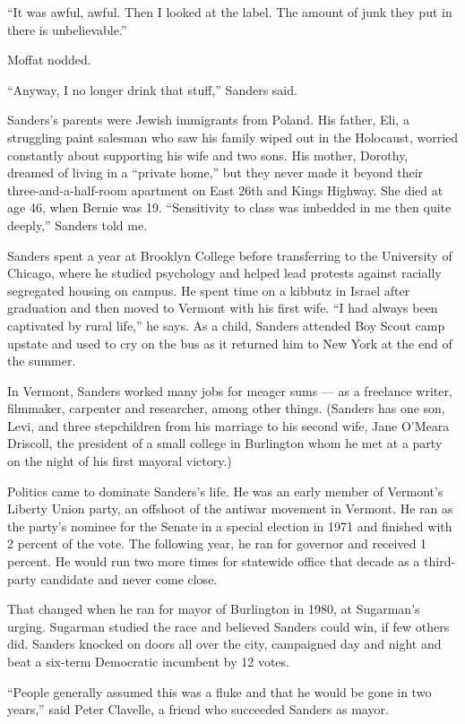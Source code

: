 ``It was awful, awful. Then I looked at the label. The amount of junk
they put in there is unbelievable.''

Moffat nodded.

``Anyway, I no longer drink that stuff,'' Sanders said.

Sanders's parents were Jewish immigrants from Poland. His father, Eli, a
struggling paint salesman who saw his family wiped out in the Holocaust,
worried constantly about supporting his wife and two sons. His mother,
Dorothy, dreamed of living in a ``private home,'' but they never made it
beyond their three-and-a-half-room apartment on East 26th and Kings
Highway. She died at age 46, when Bernie was 19. ``Sensitivity to class
was imbedded in me then quite deeply,'' Sanders told me.

Sanders spent a year at Brooklyn College before transferring to the
University of Chicago, where he studied psychology and helped lead
protests against racially segregated housing on campus. He spent time on
a kibbutz in Israel after graduation and then moved to Vermont with his
first wife. ``I had always been captivated by rural life,'' he says. As
a child, Sanders attended Boy Scout camp upstate and used to cry on the
bus as it returned him to New York at the end of the summer.

In Vermont, Sanders worked many jobs for meager sums --- as a freelance
writer, filmmaker, carpenter and researcher, among other things.
(Sanders has one son, Levi, and three stepchildren from his marriage to
his second wife, Jane O'Meara Driscoll, the president of a small college
in Burlington whom he met at a party on the night of his first mayoral
victory.)

Politics came to dominate Sanders's life. He was an early member of
Vermont's Liberty Union party, an offshoot of the antiwar movement in
Vermont. He ran as the party's nominee for the Senate in a special
election in 1971 and finished with 2 percent of the vote. The following
year, he ran for governor and received 1 percent. He would run two more
times for statewide office that decade as a third-party candidate and
never come close.

That changed when he ran for mayor of Burlington in 1980, at Sugarman's
urging. Sugarman studied the race and believed Sanders could win, if few
others did. Sanders knocked on doors all over the city, campaigned day
and night and beat a six-term Democratic incumbent by 12 votes.

``People generally assumed this was a fluke and that he would be gone in
two years,'' said Peter Clavelle, a friend who succeeded Sanders as
mayor.

